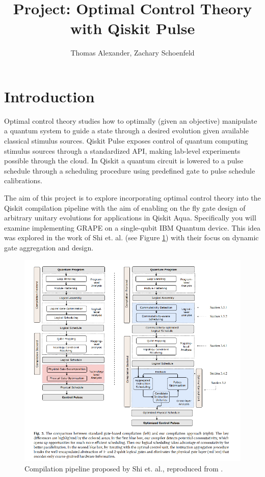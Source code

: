 \documentclass[11pt, letterpaper]{article}
\author{Thomas Alexander, Zachary Schoenfeld}
\title{Project: Optimal Control Theory with Qiskit Pulse}
\begin{document}
\maketitle
\tableofcontents

\section{Introduction}
Optimal control theory studies how to optimally (given an objective) manipulate a quantum system
to guide a state through a desired evolution given available classical
stimulus sources. Qiskit Pulse exposes control of quantum computing
stimulus sources through a standardized API, making lab-level experiments
possible through the cloud. In Qiskit a quantum circuit is lowered to a pulse
schedule through a scheduling procedure using predefined gate to pulse schedule
calibrations.

The aim of this project is to explore incorporating optimal control theory
into the Qiskit compilation pipeline with the aim of enabling on the fly
gate design of arbitrary unitary evolutions for applications in Qiskit Aqua.
Specifically you will examine implementing GRAPE \cite{khanejaOptimalControlCoupled2005c} on
a single-qubit IBM Quantum device.
This idea was explored in the work of Shi et. al. \cite{shiOptimizedCompilationAggregated2019b}
(see Figure \ref{fig:compilationpipeline}) with their focus on dynamic gate
aggregation and design.

\begin{figure}[hbt!]
 \centering
 \includegraphics[width=\linewidth]{../figures/yunong_pipeline.png}
 \caption{Compilation pipeline proposed by Shi et. al., reproduced from \cite{shiOptimizedCompilationAggregated2019b}.}
 \label{fig:compilationpipeline}
\end{figure}
\end{document}
